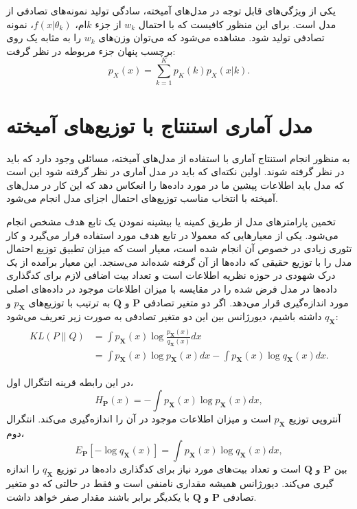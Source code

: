 یکی از ویژگی‌های قابل توجه در مدل‌های آمیخته، سادگی تولید نمونه‌های تصادفی از مدل است. برای این منظور کافیست که با احتمال
$w_k$
از جزء $k$ام،
$f(x|\theta_k)$،
نمونه تصادفی تولید شود. مشاهده می‌شود که می‌توان وزن‌های
$w_k$
را به مثابه یک
{}
روی برچسب پنهان جزء مربوطه در نظر گرفت:
$$p_X(x)=\sum_{k=1}^{K}p_K(k)p_X(x|k).$$

\section{مدل آماری استنتاج با توزیع‌های آمیخته}
به منظور انجام استنتاج آماری با استفاده از مدل‌های آمیخته، مسائلی وجود دارد که باید در نظر گرفته شوند.
اولین نکته‌ای که باید در مدل آماری در نظر گرفته شود این است که مدل باید اطلاعات پیشین ما در مورد داده‌ها را انعکاس دهد که این کار در مدل‌های آمیخته با انتخاب مناسب توزیع‌های احتمال اجزای مدل انجام می‌شود.

تخمین پارامترهای مدل از طریق کمینه یا بیشینه نمودن یک تابع هدف مشخص انجام می‌شود.
یکی از معیارهایی که معمولا در تابع هدف مورد استفاده قرار می‌گیرد و کار تئوری زیادی در خصوص آن انجام شده است، معیار
{}
است که میزان تطبیق توزیع احتمال مدل را با توزیع حقیقی که داده‌ها از آن گرفته شده‌اند می‌سنجد.
این معیار برآمده از یک درک شهودی در حوزه نظریه اطلاعات است و تعداد بیت اضافی لازم برای کدگذاری داده‌ها در مدل فرض شده را در مقایسه با میزان اطلاعات موجود در داده‌های اصلی مورد اندازه‌گیری قرار می‌دهد.
اگر دو متغیر تصادفی
$\bm{P}$
و
$\bm{Q}$
به ترتیب با توزیع‌های
$p_{\bm{X}}$
و
$q_{\bm{X}}$
داشته باشیم، دیورژانس  بین این دو متغیر تصادفی به صورت زیر تعریف می‌شود:
\begin{eqnarray}\label{eq:kl}
\begin{split}
KL(P \parallel Q) & =\int p_{\bm{X}}(x) \log \frac{p_{\bm{X}}(x)}{q_{\bm{X}}(x)} dx\\
& =\int p_{\bm{X}}(x) \log p_{\bm{X}}(x) dx -
\int p_{\bm{X}}(x) \log q_{\bm{X}}(x) dx.
\end{split}
\end{eqnarray}

در این رابطه قرینه انتگرال اول،
$$H_{\bm{P}}(x) = - \int p_{\bm{X}}(x) \log p_{\bm{X}}(x) dx,$$
آنتروپی توزیع
$p_{\bm{X}}$
است و میزان اطلاعات موجود در آن را اندازه‌گیری می‌کند.
انتگرال دوم،
$$E_{\bm{P}}[-\log q_{\bm{X}}(x)] = \int p_{\bm{X}}(x) \log q_{\bm{X}}(x) dx,$$
{}
بین
$\bm{P}$
و
$\bm{Q}$
است و تعداد بیت‌های مورد نیاز برای کدگذاری داده‌ها در توزیع
$q_{\bm{X}}$
را اندازه گیری می‌کند. دیورژانس  همیشه مقداری نامنفی است و فقط در حالتی که دو متغیر تصادفی
$\bm{P}$
و
$\bm{Q}$
با یکدیگر برابر باشند مقدار صفر خواهد داشت\cite{dembo_information_1991}.

